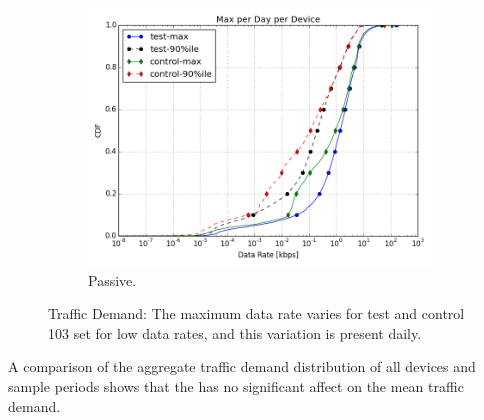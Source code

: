 \begin{figure}[t]
\begin{minipage}{1\linewidth}
\begin{subfigure}[b]{0.39\linewidth}
\includegraphics[width=\linewidth]{figures/cdf-max-per-day-per-device.png}
               \caption{Passive.\label{fig:tsval-passive}}
\end{subfigure}
%
\end{minipage}
\caption{Traffic Demand: The maximum data rate varies for test and control
103 set for low data rates, and this variation is present daily.}
\label{fig:tsval}
\end{figure}



A comparison of the aggregate traffic demand distribution of all devices 
and sample periods shows that the \treatment{} has no significant affect on the 
mean traffic demand. 
